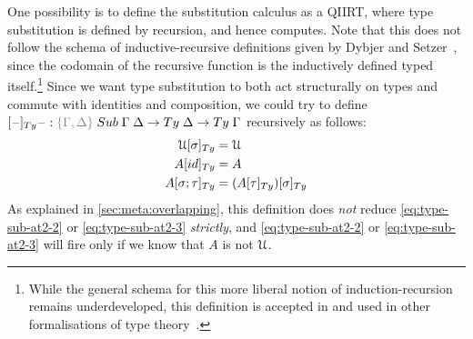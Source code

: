\documentclass[a4paper,UKenglish,numberwithinsect,cleveref,thm-restate]{lipics-v2021}
\begin{document}
One possibility is to define the substitution calculus as a QIIRT, where type substitution is defined by recursion, and hence computes.
Note that this does not follow the schema of inductive-recursive definitions given by Dybjer and Setzer~\cite{Dybjer2000,Dybjer2003}, since the codomain of the recursive function is the inductively defined typed itself.\footnote{%
  While the general schema for this more liberal notion of induction-recursion remains underdeveloped, this definition is accepted in \Agda and used in other formalisations of type theory~\cite{Danielsson2006}.}
%
Since we want type substitution to both act structurally on types and commute with identities and composition, we could try to define$[\blank]_{\Ty} \blank : \implicit{\Gamma, \Delta} \; \Sub\;\Gamma\;\Delta \to \Ty\;\Delta \to \Ty\;\Gamma$ recursively as follows:
\begin{alignat}{3}
\subTy{\UU}{\sigma}  & = \UU                                   \label{eq:type-sub-at2-1} \\
\subTy{A}{\idS}    & = A                                     \label{eq:type-sub-at2-2} \\
\subTy{A}{\sigma ; \tau}    & = \subTy{(\subTy{A}{\tau})}{\sigma} \label{eq:type-sub-at2-3}
\end{alignat}
As explained in \cref{sec:meta:overlapping}, this definition does \emph{not} reduce \eqref{eq:type-sub-at2-2} or \eqref{eq:type-sub-at2-3} \emph{strictly}, and \eqref{eq:type-sub-at2-2} or \eqref{eq:type-sub-at2-3} will fire only if we know that $A$ is not $\mathcal{U}$.
\end{document}
